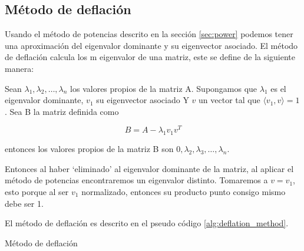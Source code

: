 \subsection{Método de deflación}

Usando el método de potencias descrito en la sección \ref{sec:power} podemos tener una aproximación del eigenvalor dominante y su eigenvector asociado. El método de deflación calcula los m eigenvalor de una matriz, este se define de la siguiente manera:

Sean $\lambda_1,\lambda_2,\dots,\lambda_n$ los valores propios de la matriz A. Supongamos que $\lambda_1$ es el eigenvalor dominante, $v_1$ su eigenvector asociado Y $v$ un vector tal que $\langle v_1, v \rangle = 1$. Sea B la matriz definida como

\begin{equation*}
    B =A -\lambda_1 v_1 v^T
\end{equation*}

entonces los valores propios de la matriz B son $0,\lambda_2,\lambda_3,\dots,\lambda_n$.

Entonces al haber `eliminado' al eigenvalor dominante de la matriz, al aplicar el método de potencias encontraremos un eigenvalor distinto. Tomaremos a $v=v_1$, esto porque al ser $v_1$ normalizado, entonces su producto punto consigo mismo debe ser 1.

El método de deflación es descrito en el pseudo código \ref{alg:deflation_method}.


\begin{algorithm}[H]
    \caption{Método de deflación}
    \label{alg:deflation_method}
\end{algorithm}
